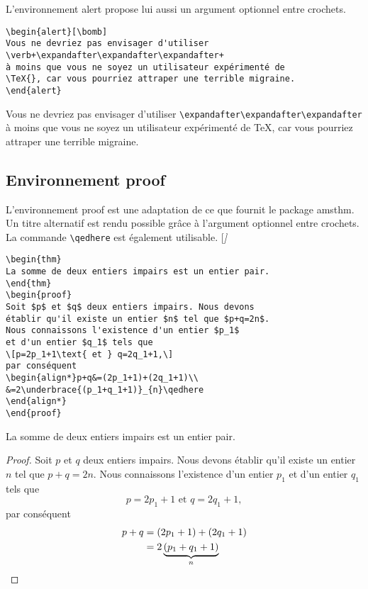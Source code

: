 \documentclass[french,ColorTheme=USAF,FontSize=10pt]{tango}
\newcommand\TO[1]{\textsf{#1}}
\begin{document}
L'environnement \TO{alert} propose lui aussi un argument optionnel entre crochets.
\begin{tcolorbox}
\begin{verbatim}
\begin{alert}[\bomb]
Vous ne devriez pas envisager d'utiliser 
\verb+\expandafter\expandafter\expandafter+
à moins que vous ne soyez un utilisateur expérimenté de
\TeX{}, car vous pourriez attraper une terrible migraine.
\end{alert}
\end{verbatim}
\end{tcolorbox}
\begin{alert}[\bomb]
Vous ne devriez pas envisager d'utiliser 
\verb+\expandafter\expandafter\expandafter+
à moins que vous ne soyez un utilisateur expérimenté de
\TeX{}, car vous pourriez attraper une terrible migraine.
\end{alert}

\subsection{Environnement proof}
L'environnement \TO{proof} est une adaptation de ce que fournit le package  \TO{amsthm}. Un titre alternatif est rendu possible grâce à l'argument optionnel entre crochets. La commande \verb+\qedhere+ est également utilisable.
[\itshape]
\setcounter{thm}{0}
\begin{tcolorbox}
\begin{verbatim}
\begin{thm}
La somme de deux entiers impairs est un entier pair.
\end{thm}
\begin{proof}
Soit $p$ et $q$ deux entiers impairs. Nous devons
établir qu'il existe un entier $n$ tel que $p+q=2n$.
Nous connaissons l'existence d'un entier $p_1$ 
et d'un entier $q_1$ tels que
\[p=2p_1+1\text{ et } q=2q_1+1,\]
par conséquent
\begin{align*}p+q&=(2p_1+1)+(2q_1+1)\\
&=2\underbrace{(p_1+q_1+1)}_{n}\qedhere
\end{align*}
\end{proof}
\end{verbatim}
\end{tcolorbox}
\begin{thm}
La somme de deux entiers impairs est un entier pair.
\end{thm}
\begin{proof}
Soit $p$ et $q$ deux entiers impairs. Nous devons
établir qu'il existe un entier $n$ tel que $p+q=2n$.
Nous connaissons l'existence d'un entier $p_1$ 
et d'un entier $q_1$ tels que
\[p=2p_1+1\text{ et } q=2q_1+1,\]
par conséquent
\begin{align*}p+q&=(2p_1+1)+(2q_1+1)\\
&=2\underbrace{(p_1+q_1+1)}_{n}\qedhere
\end{align*}
\end{proof}
\end{document}

